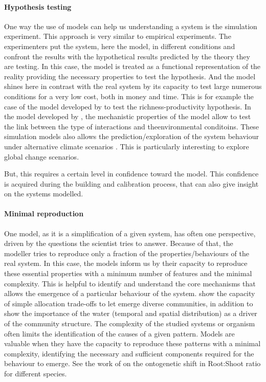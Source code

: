 \paragraph{Hypothesis testing}

One way the use of models can help us understanding a system is the simulation experiment. This approach is very similar to empirical experiments. The experimenters put the system, here the model, in different conditions and confront the results with the hypothetical results predicted by the theory they are testing. In this case, the model is treated as a functional representation of the reality providing the necessary properties to test the hypothesis. And the model shines here in contrast with the real system by its capacity to test large numerous conditions for a very low cost, both in money and time. This is for example the case of the model developed by \cite{taubert_modelling_2014} to test the richness-productivity hypothesis. In the model developed by \cite{droz_model_2013}, the mechanistic properties of the model allow to test the link between the type of interactions and theenvironmental conditoins. These simulation models also allows the prediction/exploration of the system behaviour under alternative climate scenarios \parencite{rodriguez_lingra-cc:_1999, scheiter_impacts_2009}. This is particularly interesting to explore global change scenarios.

But, this requires a certain level in confidence toward the model. This confidence is acquired during the building and calibration process, that can also give insight on the systems modelled.

\paragraph{Minimal reproduction}

One model, as it is a simplification of a given system, has often one perspective, driven by the questions the scientist tries to answer. Because of that, the modeller tries to reproduce only a fraction of the properties/behaviours of the real system. In this case, the models inform us by their capacity to reproduce these essential properties with a minimum number of features and the minimal complexity. This is helpful to identify and understand the core mechanisms that allows the emergence of a particular behaviour of the system. \cite{reineking_environmental_2006} show the capacity of simple allocation trade-offs to let emerge diverse communities, in addition to show the importance of the water (temporal and spatial distribution) as a driver of the community structure. The complexity of the studied systems or organism often limits the identification of the causes of a given pattern. Models are valuable when they have the capacity to reproduce these patterns with a minimal complexity, identifying the necessary and sufficient components required for the behaviour to emerge. See the work of \cite{lohier_explaining_2014} on the ontogenetic shift in Root:Shoot ratio for different species.


